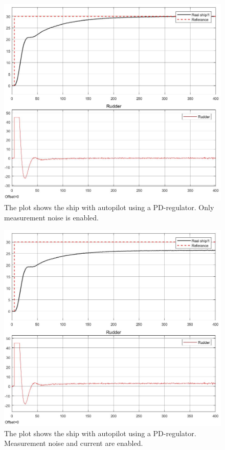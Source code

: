 \begin{figure}[H]
    \centering
    \includegraphics[width=1\textwidth]{Plots/3b_compass_and_ref.jpg}
    \caption{The plot shows the ship with autopilot using a PD-regulator. Only measurement noise is enabled.}
    \label{fig: 3b_plot}
\end{figure}

\begin{figure}[H]
    \centering
    \includegraphics[width=1\textwidth]{Plots/3c_compass_and_ref.jpg}
    \caption{The plot shows the ship with autopilot using a PD-regulator. Measurement noise and current are enabled.}
    \label{fig: 3c_plot}
\end{figure}

